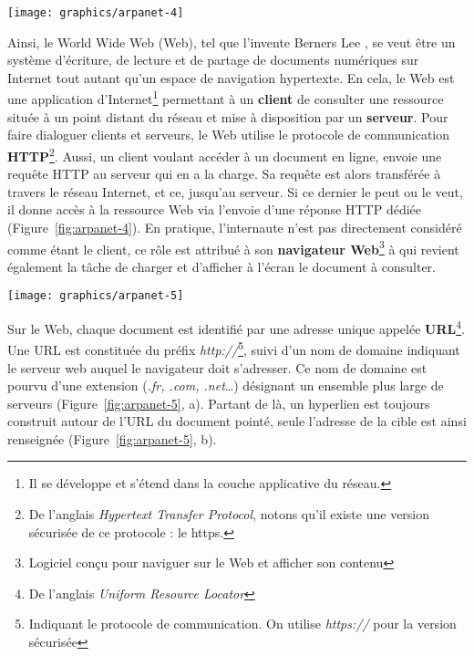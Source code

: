 \documentclass[symmetric,justified,marginals=raggedouter]{tufte-book}
\begin{document}
\begin{figure*}
  \texttt{[image: graphics/arpanet-4]}
  \caption{Communication HTTP entre un client et un serveur sur le Web}
  \label{fig:arpanet-4}
\end{figure*} 

\noindent Ainsi, le World Wide Web (Web), tel que l'invente Berners Lee \citep{cern_document_1993}, se veut être un système d'écriture, de lecture et de partage de documents numériques sur Internet tout autant qu'un espace de navigation hypertexte. En cela, le Web est une application d'Internet\footnote{\RaggedOuter Il se développe et s'étend dans la couche applicative du réseau.} permettant à un \textbf{client} de consulter une ressource située à un point distant du réseau et mise à disposition par un \textbf{serveur}. Pour faire dialoguer clients et serveurs, le Web utilise le protocole de communication \textbf{HTTP}\footnote{\RaggedOuter De l'anglais \textit{Hypertext Transfer Protocol}, notons qu'il existe une version sécurisée de ce protocole : le https.}. Aussi, un client voulant accéder à un document en ligne, envoie une requête HTTP au serveur qui en a la charge. Sa requête est alors transférée à travers le réseau Internet, et ce, jusqu'au serveur. Si ce dernier le peut ou le veut, il donne accès à la ressource Web via l'envoie d'une réponse HTTP dédiée (Figure~\ref{fig:arpanet-4}). En pratique, l'internaute n'est pas directement considéré comme étant le client, ce rôle est attribué à son \textbf{navigateur Web}\footnote{\RaggedOuter Logiciel conçu pour naviguer sur le Web et afficher son contenu} à qui revient également la tâche de charger et d'afficher à l'écran le document à consulter. 

\begin{figure*}
  \texttt{[image: graphics/arpanet-5]}
  \caption{De la page au site Web}
  \label{fig:arpanet-5}
\end{figure*} 

Sur le Web, chaque document est identifié par une adresse unique appelée \textbf{URL}\footnote{\RaggedOuter De l'anglais \textit{Uniform Resource Locator}}. Une URL est constituée du préfix \textit{http://}\footnote{\RaggedOuter Indiquant le protocole de communication. On utilise \textit{https://} pour la version sécurisée}, suivi d'un nom de domaine indiquant le serveur web auquel le navigateur doit s'adresser. Ce nom de domaine est pourvu d'une extension (\textit{.fr, .com, .net}\ldots{}) désignant un ensemble plus large de serveurs (Figure~\ref{fig:arpanet-5}, a). Partant de là, un hyperlien est toujours construit autour de l'URL du document pointé, seule l'adresse de la cible est ainsi renseignée (Figure~\ref{fig:arpanet-5}, b).  
\end{document}
